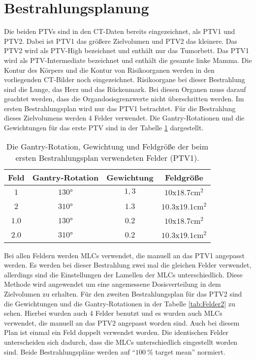\section{Bestrahlungsplanung}
\label{sec:Bestrahlungsplanung}
Die beiden PTVs sind in den CT-Daten bereits eingezeichnet, als PTV1 und PTV2.
Dabei ist PTV1 das größere Zielvolumen und PTV2 das kleinere. Das PTV2 wird als PTV-High bezeichnet und enthält nur das Tumorbett.
Das PTV1 wird als PTV-Intermediate bezeichnet und enthält die gesamte linke Mamma.
Die Kontur des Körpers und die Kontur von Risikoorganen werden in den vorliegenden CT-Bilder noch eingezeichnet.
Risikoorgane bei dieser Bestrahlung sind die Lunge, das Herz und das Rückenmark.
Bei diesen Organen muss darauf geachtet werden, dass die Organdosisgrenzwerte nicht überschritten werden.
Im ersten Bestrahlungsplan wird nur das PTV1 betrachtet. Für die Bestrahlung dieses Zielvolumens werden 4 Felder verwendet.
Die Gantry-Rotationen und die Gewichtungen für das erste PTV sind in der Tabelle \ref{tab:Felder1} dargestellt.

\begin{table}
	\centering
	\caption{Die Gantry-Rotation, Gewichtung und Feldgröße der beim ersten Bestrahlungsplan verwendeten Felder (PTV1).}
	\label{tab:Felder1}
	\begin{tabular}{c c c c}
		\toprule
		Feld & Gantry-Rotation & Gewichtung & Feldgröße\\
		\midrule
		$1$ & $130°$   & $1,3$ & $\num{10}$x$\num{18.7} \si{\centi\meter\squared}$ \\
		$2$ & $310°$  & $1.3$ & $\num{10.3}$x$\num{19.1} \si{\centi\meter\squared}$ \\
		$1.0$ & $130°$ & $0.2$ & $\num{10}$x$\num{18.7} \si{\centi\meter\squared}$ \\
		$2.0$ & $310°$ & $0.2$ & $\num{10.3}$x$\num{19.1} \si{\centi\meter\squared}$ \\
		\bottomrule
	\end{tabular}
\end{table}

Bei allen Feldern werden MLCs verwendet, die manuell an das PTV1 angepasst werden.
Es werden bei dieser Bestrahlung zwei mal die gleichen Felder verwendet, allerdings sind
die Einstellungen der Lamellen der MLCs unterschiedlich. Diese Methode wird angewendet um eine
angemessene Dosisverteilung in dem Zielvolumen zu erhalten.
Für den zweiten Bestrahlungsplan für das PTV2 sind die Gewichtungen und die Gantry-Rotationen in der Tabelle \ref{tab:Felder2} zu sehen.
Hierbei wurden auch 4 Felder benutzt und es wurden auch MLCs verwendet, die manuell an das PTV2 angepasst worden sind.
Auch bei diesem Plan ist einmal ein Feld doppelt verwendet worden. Die identischen Felder
unterscheiden sich dadurch, dass die MLCs unterschiedlich eingestellt worden sind.
Beide Bestrahlungspläne werden auf \enquote{$\SI{100}{\percent}$ target mean} normiert.


